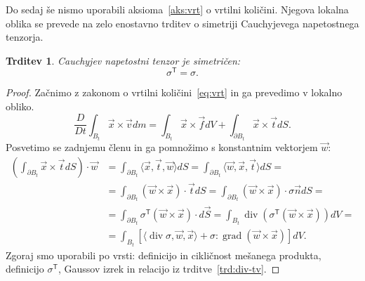 \documentclass[12pt,a4paper,twoside]{article}
\theoremstyle{definition} %
\theoremstyle{plain} %
\newtheorem{trditev}[definicija]{Trditev}
\numberwithin{equation}{section}
\newcommand{\T}{\mathsf{T}}
\renewcommand{\div}{\operatorname{div}}
\newcommand{\grad}{\operatorname{grad}}
\newcommand{\DD}[2]{\ensuremath{\frac{D #1}{D #2}}}
\newcommand{\DDt}[1]{\DD{#1}{t}}
\newcommand{\vv}{\vec{v}}
\newcommand{\vt}{\vec{t}}
\newcommand{\vw}{\vec{w}}
\newcommand{\vn}{\vec{n}}
\newcommand{\vf}{\vec{f}}
\newcommand{\vx}{\vec{x}}
\newcommand{\ts}{\sigma}
\begin{document}
Do sedaj še nismo uporabili aksioma~\ref{aks:vrt} o vrtilni količini.
Njegova lokalna oblika se prevede na zelo enostavno trditev o simetriji
Cauchyjevega napetostnega tenzorja.
\begin{trditev}
  \label{trd:sigma-symmetric}
  Cauchyjev napetostni tenzor je simetričen:
  \begin{equation}
    \ts^\T = \ts.
  \end{equation}
\end{trditev}
\begin{proof}
Začnimo z zakonom o vrtilni količini~\eqref{eq:vrt} in ga prevedimo v lokalno
obliko.
\begin{equation}
  \DDt{}\int_{B_t}\vx \times \vv dm = \int_{B_t} \vx \times \vf dV +
  \int_{\partial B_t} \vx\times\vt dS.
\end{equation}
Posvetimo se zadnjemu členu in ga pomnožimo s konstantnim vektorjem $\vw$:
\begin{align*}
\left(\int_{\partial B_t} \vx \times \vt dS\right)\cdot \vw  &=
  \int_{\partial B_t} \langle \vx, \vt, \vw \rangle dS =
  \int_{\partial B_t} \langle \vw, \vx, \vt \rangle dS = \\ &=
  \int_{\partial B_t} (\vw \times \vx) \cdot \vt dS =
  \int_{\partial B_t} (\vw \times \vx) \cdot \ts\vn dS = \\ &=
  \int_{\partial B_t} \ts^\T(\vw \times \vx) \cdot d\vec{S} =
  \int_{B_t} \div (\ts^\T(\vw \times \vx)) dV = \\ &=
\int_{B_t} [\langle \div \ts, \vw, \vx\rangle +  \ts : \grad (\vw \times \vx)] dV.
\end{align*}
Zgoraj smo uporabili po vrsti: definicijo in cikličnost mešanega produkta, definicijo
$\ts^\T\!$, Gaussov izrek in relacijo iz trditve~\ref{trd:div-tv}.


\end{proof}
\end{document}
